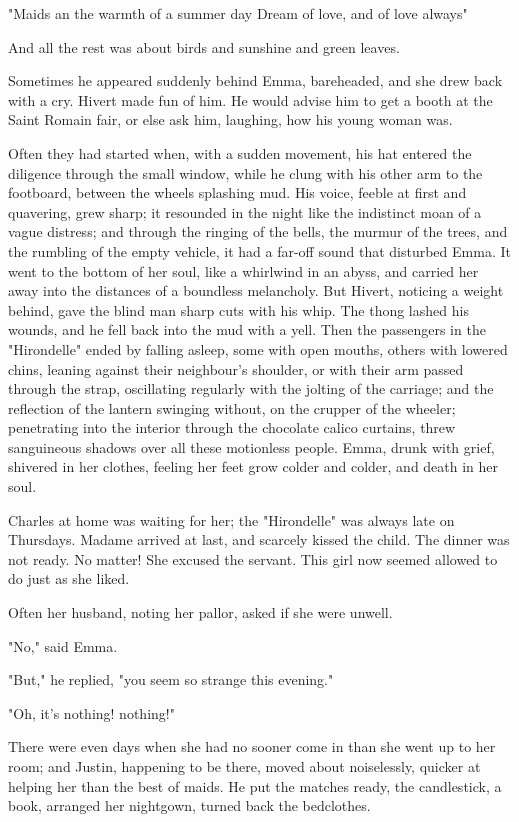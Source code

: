 \documentclass[11pt,twocolumn]{ltugboat}
\begin{document}
"Maids an the warmth of a summer day Dream of love, and of love always"

And all the rest was about birds and sunshine and green leaves.

Sometimes he appeared suddenly behind Emma, bareheaded, and she drew
back with a cry. Hivert made fun of him. He would advise him to get a
booth at the Saint Romain fair, or else ask him, laughing, how his young
woman was.

Often they had started when, with a sudden movement, his hat entered the
diligence through the small window, while he clung with his other arm
to the footboard, between the wheels splashing mud. His voice, feeble
at first and quavering, grew sharp; it resounded in the night like the
indistinct moan of a vague distress; and through the ringing of the
bells, the murmur of the trees, and the rumbling of the empty vehicle,
it had a far-off sound that disturbed Emma. It went to the bottom of
her soul, like a whirlwind in an abyss, and carried her away into the
distances of a boundless melancholy. But Hivert, noticing a weight
behind, gave the blind man sharp cuts with his whip. The thong lashed
his wounds, and he fell back into the mud with a yell. Then the
passengers in the "Hirondelle" ended by falling asleep, some with open
mouths, others with lowered chins, leaning against their neighbour's
shoulder, or with their arm passed through the strap, oscillating
regularly with the jolting of the carriage; and the reflection of the
lantern swinging without, on the crupper of the wheeler; penetrating
into the interior through the chocolate calico curtains, threw
sanguineous shadows over all these motionless people. Emma, drunk with
grief, shivered in her clothes, feeling her feet grow colder and colder,
and death in her soul.

Charles at home was waiting for her; the "Hirondelle" was always late
on Thursdays. Madame arrived at last, and scarcely kissed the child. The
dinner was not ready. No matter! She excused the servant. This girl now
seemed allowed to do just as she liked.

Often her husband, noting her pallor, asked if she were unwell.

"No," said Emma.

"But," he replied, "you seem so strange this evening."

"Oh, it's nothing! nothing!"

There were even days when she had no sooner come in than she went up to
her room; and Justin, happening to be there, moved about noiselessly,
quicker at helping her than the best of maids. He put the matches
ready, the candlestick, a book, arranged her nightgown, turned back the
bedclothes.
\end{document}
